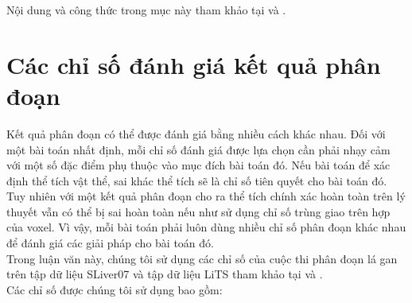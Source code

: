 Nội dung và công thức trong mục này tham khảo tại \cite{661192} và \cite{56205}.


\section{Các chỉ số đánh giá kết quả phân đoạn}
Kết quả phân đoạn có thể được đánh giá bằng nhiều cách khác nhau. Đối với một bài toán nhất định, mỗi chỉ số đánh giá được lựa chọn cần phải nhạy cảm với một số đặc điểm phụ thuộc vào mục đích bài toán đó. Nếu bài toán để xác định thể tích vật thể, sai khác thể tích sẽ là chỉ số tiên quyết cho bài toán đó. Tuy nhiên với một kết quả phân đoạn cho ra thể tích chính xác hoàn toàn trên lý thuyết vẫn có thể bị sai hoàn toàn nếu như sử dụng chỉ số trùng giao trên hợp của voxel. Vì vậy, mỗi bài toán phải luôn dùng nhiều chỉ số phân đoạn khác nhau để đánh giá các giải pháp cho bài toán đó.\\
Trong luận văn này, chúng tôi sử dụng các chỉ số của cuộc thi phân đoạn lá gan trên tập dữ liệu SLiver07 và tập dữ liệu LiTS tham khảo tại \cite{SLiver07metric} và \cite{website:LiTS}. \\
Các chỉ số được chúng tôi sử dụng bao gồm:
